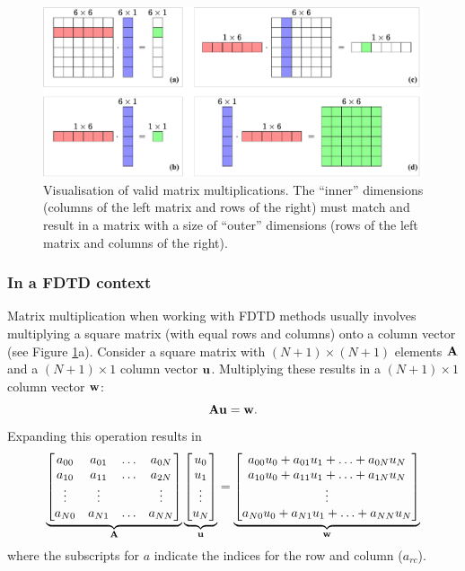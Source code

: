 \begin{figure}[h]
    \includegraphics[width=\textwidth]{figures/analysis/matrixVector.pdf}
    \caption{Visualisation of valid matrix multiplications. The ``inner'' dimensions (columns of the left matrix and rows of the right) must match and result in a matrix with a size of ``outer'' dimensions (rows of the left matrix and columns of the right). \label{fig:matrixVector}}
\end{figure}

\subsubsection{In a FDTD context}
Matrix multiplication when working with FDTD methods usually involves multiplying a square matrix (with equal rows and columns) onto a column vector (see Figure \ref{fig:matrixVector}a). Consider a square matrix with $(N+1)\times (N+1)$ elements $\mathbf{A}$ and a $(N+1) \times 1$ column vector $\mathbf{u}$. Multiplying these results in a $(N+1) \times 1$ column vector $\mathbf{w}$:
\begin{equation}
    \mathbf{A}\mathbf{u} = \mathbf{w}.
\end{equation}
Expanding this operation results in 
\begin{equation}
    \underbrace{\begin{bmatrix}
        a_{00} & a_{01} & \hdots & a_{0N}\\
        a_{10} & a_{11} & \hdots & a_{2N}\\
        \vdots & \vdots & &\vdots\\
        a_{N0} & a_{N1} & \hdots & a_{NN}
    \end{bmatrix}}_{\mathbf{A}}
    \underbrace{\begin{bmatrix}
        u_0\\
        u_1\\
        \vdots\\
        u_N
    \end{bmatrix}}_{\mathbf{u}} = 
    \underbrace{\begin{bmatrix}
        a_{00}u_0 + a_{01}u_1 + \hdots + a_{0N}u_N\\
        a_{10}u_0 + a_{11}u_1 + \hdots + a_{1N}u_N\\
        \vdots\\
        a_{N0}u_0 + a_{N1}u_1 + \hdots + a_{NN}u_N
    \end{bmatrix}}_{\mathbf{w}}
\end{equation}
where the subscripts for $a$ indicate the indices for the row and column ($a_{rc}$).

